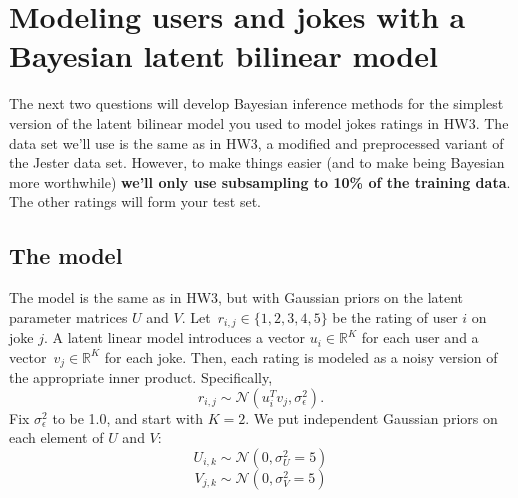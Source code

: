\documentclass{harvardml}
\newcommand{\R}{\mathbb{R}}
\theoremstyle{plain}
\begin{document}
\newpage

\section*{Modeling users and jokes with a Bayesian latent bilinear model}

The next two questions will develop Bayesian inference methods for the simplest version of the latent bilinear model you used to model jokes ratings in HW3. The data set we'll use is the same as in HW3, a modified and preprocessed variant of the Jester data set. However, to make things easier (and to make being Bayesian more worthwhile) {\bf we'll only use subsampling to 10\% of the training data}.  The other ratings will form your test set.

\subsection*{The model}

The model is the same as in HW3, but with Gaussian priors on the latent parameter matrices $U$ and $V$. Let~${r_{i,j}\in\{1,2,3,4,5\}}$ be the rating of user $i$ on joke $j$.  A latent linear model introduces a vector ${u_i\in\R^K}$ for each user and a vector~${v_j\in\R^K}$ for each joke.  Then, each rating is modeled as a noisy version of the appropriate inner product. Specifically,
\[
r_{i,j} \sim \mathcal{N}(u_i^T v_j, \sigma_\epsilon^2).
\]
Fix $\sigma_\epsilon^2$ to be 1.0, and start with $K = 2$. We put independent Gaussian priors on each element of $U$ and $V$:
\[U_{i,k} \sim \mathcal{N}(0, \sigma_U^2=5)\]
\[V_{j,k} \sim \mathcal{N}(0, \sigma_V^2=5)\]
\end{document}
